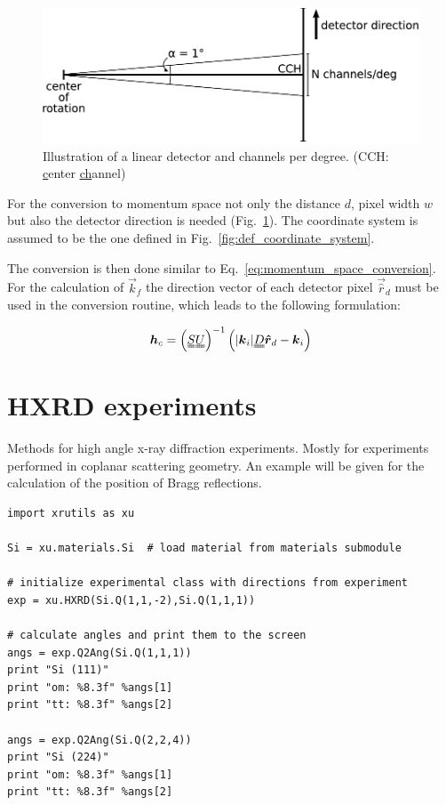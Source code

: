 \begin{figure}[H]
 \centering
 \includegraphics[width=0.6\linewidth]{pics/linear_detector_chpdeg}
 \caption{Illustration of a linear detector and channels per degree. (CCH: \underline{c}enter \underline{ch}annel)}
 \label{fig:detector_chpdeg}
\end{figure}

For the conversion to momentum space not only the distance $d$, pixel width $w$ but also the detector direction is needed (Fig.~\ref{fig:detector_chpdeg}). The coordinate system is assumed to be the one defined in Fig.~\ref{fig:def_coordinate_system}.

The conversion is then done similar to Eq.~\ref{eq:momentum_space_conversion}. For the calculation of $\vec k_f$ the direction vector of each detector pixel $\vec{\hat r}_d$ must be used in the conversion routine, which leads to the following formulation:

\begin{align}
\vec h_c = \left( \mat S \mat U \right)^{-1} \left(|\vec k_i| \mat D \vec{\hat r}_d - \vec k_i  \right)
 \label{eq:momentum_space_conversion_detector}
\end{align}


\section{HXRD experiments}

Methods for high angle x-ray diffraction experiments. Mostly for experiments performed in coplanar scattering geometry. An example will be given for the calculation of the position of Bragg reflections.

\begin{lstlisting}[caption=calculation of angles for Si Bragg reflections]
import xrutils as xu

Si = xu.materials.Si  # load material from materials submodule

# initialize experimental class with directions from experiment
exp = xu.HXRD(Si.Q(1,1,-2),Si.Q(1,1,1))

# calculate angles and print them to the screen
angs = exp.Q2Ang(Si.Q(1,1,1))
print "Si (111)"
print "om: %8.3f" %angs[1]
print "tt: %8.3f" %angs[2]

angs = exp.Q2Ang(Si.Q(2,2,4))
print "Si (224)"
print "om: %8.3f" %angs[1]
print "tt: %8.3f" %angs[2]
\end{lstlisting}



